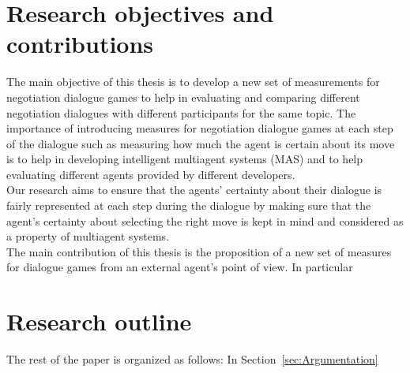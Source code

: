 \section{Research objectives and contributions}\label{sec:contribution}

The main objective of this thesis is to develop a new set of measurements for negotiation dialogue games to help in evaluating and
comparing different negotiation dialogues with different participants for the same topic. The importance of introducing measures for
negotiation dialogue games at each step of the dialogue such as measuring how much the agent is certain about its move is to help in developing intelligent multiagent systems (MAS) and to help evaluating different agents provided by different developers.\\
\indent Our research aims to ensure that the agents' certainty about their dialogue is fairly represented at each step during
the dialogue by making sure that the agent's certainty about selecting the right move is kept in mind and considered as a property
of multiagent systems.\\
\indent The main contribution of this thesis is the proposition of a new set of measures for dialogue games from an external agent's point of view.
In particular


\section{Research outline}\label{sec:outline}
The rest of the paper is organized as follows: In Section~\ref{sec:Argumentation}






